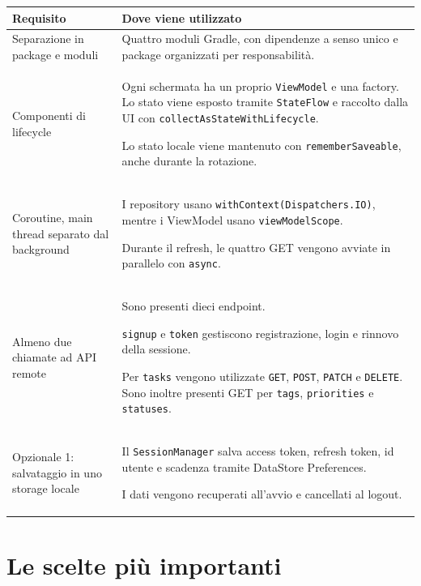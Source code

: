 \documentclass[11pt,a4paper]{article}
\begin{document}
\begin{table}[h]
\centering
\begin{tabular}{@{}p{4.2cm}p{9.4cm}@{}}
\toprule
Requisito & Dove viene utilizzato \\
\midrule

Separazione in package e moduli &
Quattro moduli Gradle, con dipendenze a senso unico e package organizzati per
responsabilità. \\

\addlinespace[0.5em]

Componenti di lifecycle &
Ogni schermata ha un proprio \texttt{ViewModel} e una factory.
Lo stato viene esposto tramite \texttt{StateFlow} e raccolto dalla UI con
\texttt{collectAsStateWithLifecycle}.

Lo stato locale viene mantenuto con \texttt{rememberSaveable}, anche durante
la rotazione. \\

\addlinespace[0.5em]

Coroutine, main thread separato dal background &
I repository usano \texttt{withContext(Dispatchers.IO)}, mentre i ViewModel
usano \texttt{viewModelScope}.

Durante il refresh, le quattro GET vengono avviate in parallelo con
\texttt{async}. \\

\addlinespace[0.5em]

Almeno due chiamate ad API remote &
Sono presenti dieci endpoint.

\texttt{signup} e \texttt{token} gestiscono registrazione, login e rinnovo
della sessione.

Per \texttt{tasks} vengono utilizzate \texttt{GET}, \texttt{POST},
\texttt{PATCH} e \texttt{DELETE}. Sono inoltre presenti GET per
\texttt{tags}, \texttt{priorities} e \texttt{statuses}. \\

\addlinespace[0.5em]

Opzionale 1: salvataggio in uno storage locale &
Il \texttt{SessionManager} salva access token, refresh token, id utente e
scadenza tramite DataStore Preferences.

I dati vengono recuperati all'avvio e cancellati al logout. \\

\bottomrule
\end{tabular}
\end{table}


\section{Le scelte più importanti}
\end{document}
